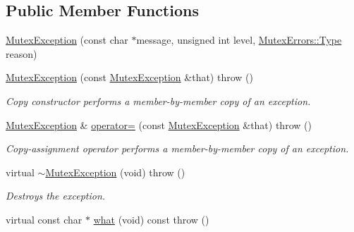 \subsection*{Public Member Functions}
\begin{DoxyCompactItemize}
\item 
\hyperlink{classLoki_1_1MutexException_a0785e768d83f08d5a9f0156827aac238}{Mutex\+Exception} (const char $\ast$message, unsigned int level, \hyperlink{classLoki_1_1MutexErrors_acd0eb6065ca303083d2e0229d7bff590}{Mutex\+Errors\+::\+Type} reason)
\item 
\hypertarget{classLoki_1_1MutexException_a210613fe3eb7005a128fd85f297b85c9}{}\hyperlink{classLoki_1_1MutexException_a210613fe3eb7005a128fd85f297b85c9}{Mutex\+Exception} (const \hyperlink{classLoki_1_1MutexException}{Mutex\+Exception} \&that)  throw ()\label{classLoki_1_1MutexException_a210613fe3eb7005a128fd85f297b85c9}

\begin{DoxyCompactList}\small\item\em Copy constructor performs a member-\/by-\/member copy of an exception. \end{DoxyCompactList}\item 
\hypertarget{classLoki_1_1MutexException_a83db7c4cea71a007dd597061833f40ea}{}\hyperlink{classLoki_1_1MutexException}{Mutex\+Exception} \& \hyperlink{classLoki_1_1MutexException_a83db7c4cea71a007dd597061833f40ea}{operator=} (const \hyperlink{classLoki_1_1MutexException}{Mutex\+Exception} \&that)  throw ()\label{classLoki_1_1MutexException_a83db7c4cea71a007dd597061833f40ea}

\begin{DoxyCompactList}\small\item\em Copy-\/assignment operator performs a member-\/by-\/member copy of an exception. \end{DoxyCompactList}\item 
\hypertarget{classLoki_1_1MutexException_ada086bdfbb91bb49ef96d6961f39b417}{}virtual \hyperlink{classLoki_1_1MutexException_ada086bdfbb91bb49ef96d6961f39b417}{$\sim$\+Mutex\+Exception} (void)  throw ()\label{classLoki_1_1MutexException_ada086bdfbb91bb49ef96d6961f39b417}

\begin{DoxyCompactList}\small\item\em Destroys the exception. \end{DoxyCompactList}\item 
\hypertarget{classLoki_1_1MutexException_a7f27c5ead8129c709c16f1a94a427361}{}virtual const char $\ast$ \hyperlink{classLoki_1_1MutexException_a7f27c5ead8129c709c16f1a94a427361}{what} (void) const   throw ()\label{classLoki_1_1MutexException_a7f27c5ead8129c709c16f1a94a427361}


\end{DoxyCompactItemize}
